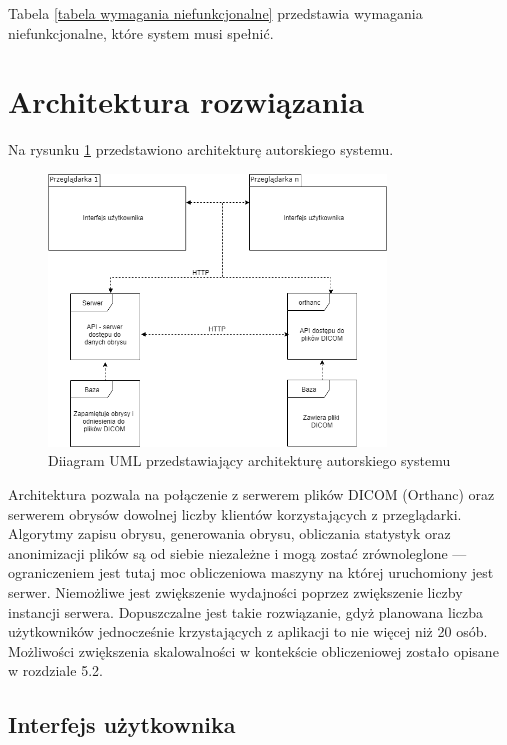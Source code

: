 \documentclass[a4paper,11pt,twoside]{report}
\theoremstyle{definition}
\begin{document}
Tabela \ref{tabela wymagania niefunkcjonalne} przedstawia wymagania niefunkcjonalne, które system musi spełnić.

\section {Architektura rozwiązania}

Na rysunku \ref{fig:architektura} przedstawiono architekturę autorskiego systemu.

\begin{figure}[h]
	\center
	\includegraphics[width=0.8\textwidth]{architektura}
	\caption{Diiagram UML przedstawiający architekturę autorskiego systemu}
    	\label{fig:architektura}
\end{figure}
 
Architektura pozwala na połączenie z serwerem plików DICOM (Orthanc) oraz serwerem obrysów dowolnej liczby klientów korzystających z przeglądarki. Algorytmy zapisu obrysu, generowania obrysu, obliczania statystyk oraz anonimizacji plików są od siebie niezależne i mogą zostać zrównoleglone --- ograniczeniem jest tutaj moc obliczeniowa maszyny na której uruchomiony jest serwer. Niemożliwe jest zwiększenie wydajności poprzez zwiększenie liczby instancji serwera. Dopuszczalne jest takie rozwiązanie, gdyż planowana liczba użytkowników jednocześnie krzystających z aplikacji to nie więcej niż 20 osób. Możliwości zwiększenia skalowalności w kontekście obliczeniowej zostało opisane w rozdziale 5.2.

\subsection {Interfejs użytkownika}
\end{document}
